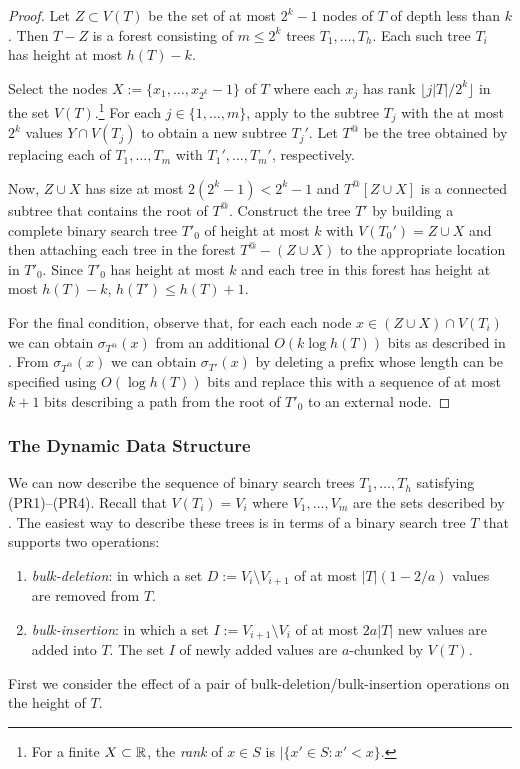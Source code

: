 \documentclass[kpfonts]{patmorin}
\newcommand{\snote}[1]{\fcolorbox{red}{yellow}{#1}}
\newcommand{\pnote}[1]{\ \newline\noindent\fcolorbox{red}{yellow}{\begin{minipage}{\textwidth}#1\end{minipage}}}
\begin{document}
\begin{proof}
  Let $Z\subset V(T)$ be the set of at most $2^k-1$ nodes of $T$ of depth less than $k$.  Then $T-Z$ is a forest consisting of $m\le 2^{k}$ trees $T_1,\ldots,T_h$.  Each such tree $T_i$ has height at most $h(T)-k$.
  
  Select the nodes $X:=\{x_1,\ldots,x_{2^k}-1\}$ of $T$ where each $x_j$ has rank $\lfloor j|T|/2^k\rfloor$ in the set $V(T)$.\footnote{For a finite $X\subset\mathbb{R}$, the \emph{rank} of $x\in S$ is $|\{x'\in S: x'<x\}$.}  For each $j\in\{1,\ldots,m\}$, apply  to the subtree $T_j$ with the at most $2^k$ values $Y\cap V(T_j)$ to obtain a new subtree $T_{j}'$.  Let $T^@$ be the tree obtained by replacing each of $T_1,\ldots,T_m$ with $T_1',\ldots,T_m'$, respectively.
  
  Now, $Z\cup X$ has size at most $2(2^{k}-1)< 2^k-1$ and $T^@[Z\cup X]$ is a connected subtree that contains the root of $T^@$.  Construct the tree $T'$ by building a complete binary search tree $T'_0$ of height at most $k$ with $V(T_0')=Z\cup X$ and then attaching each tree in the forest $T^@-(Z\cup X)$ to the appropriate location in $T'_0$.  Since $T'_0$ has height at most $k$ and each tree in this forest has height at most $h(T)-k$, $h(T')\le h(T)+1$.
  
  For the final condition, observe that, for each each node $x\in (Z\cup X)\cap V(T_i)$ we can obtain $\sigma_{T^@}(x)$ from an additional $O(k\log h(T))$ bits as described in . From $\sigma_{T^@}(x)$ we can obtain $\sigma_{T'}(x)$ by deleting a prefix whose length can be specified using $O(\log h(T))$ bits and replace this with a sequence of at most $k+1$ bits describing a path from the root of $T'_0$ to an external node.\snote{define external node}
\end{proof}

\subsubsection{The Dynamic Data Structure}

We can now describe the sequence of binary search trees $T_1,\ldots,T_h$ satisfying (PR1)--(PR4).  Recall that $V(T_i)=V_{i}$ where $V_1,\ldots,V_m$ are the sets described by .  The easiest way to describe these trees is in terms of a binary search tree $T$ that supports two operations:
\begin{enumerate}
  \item \emph{bulk-deletion}: in which a set $D:=V_{i}\setminus V_{i+1}$ of at most $|T|(1-2/a)$ values are removed from $T$. 
  \item \emph{bulk-insertion}: in which a set $I:=V_{i+1}\setminus V_i$ of at most $2a|T|$ new values are added into $T$.  The set $I$ of newly added values are $a$-chunked by $V(T)$.
\end{enumerate}
First we consider the effect of a pair of bulk-deletion/bulk-insertion operations on the height of $T$.
\end{document}
